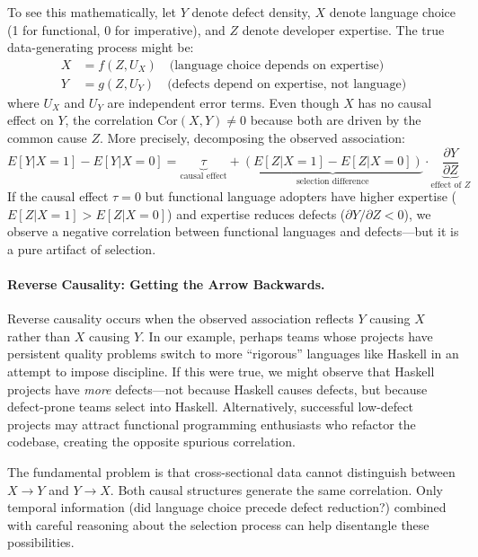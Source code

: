 To see this mathematically, let $Y$ denote defect density, $X$ denote language choice (1 for functional, 0 for imperative), and $Z$ denote developer expertise.
The true data-generating process might be:
\begin{align}
    X &= f(Z, U_X) \quad \text{(language choice depends on expertise)} \\
    Y &= g(Z, U_Y) \quad \text{(defects depend on expertise, not language)}
\end{align}
where $U_X$ and $U_Y$ are independent error terms.
Even though $X$ has no causal effect on $Y$, the correlation $\text{Cor}(X, Y) \neq 0$ because both are driven by the common cause $Z$.
More precisely, decomposing the observed association:
\begin{equation}
    E[Y | X=1] - E[Y | X=0] = \underbrace{\tau}_{\text{causal effect}} + \underbrace{(E[Z | X=1] - E[Z | X=0])}_{\text{selection difference}} \cdot \underbrace{\frac{\partial Y}{\partial Z}}_{\text{effect of $Z$}}
\end{equation}
If the causal effect $\tau = 0$ but functional language adopters have higher expertise ($E[Z|X=1] > E[Z|X=0]$) and expertise reduces defects ($\partial Y / \partial Z < 0$), we observe a negative correlation between functional languages and defects---but it is a pure artifact of selection.

\paragraph{Reverse Causality: Getting the Arrow Backwards.}
Reverse causality occurs when the observed association reflects $Y$ causing $X$ rather than $X$ causing $Y$.
In our example, perhaps teams whose projects have persistent quality problems switch to more ``rigorous'' languages like Haskell in an attempt to impose discipline.
If this were true, we might observe that Haskell projects have \emph{more} defects---not because Haskell causes defects, but because defect-prone teams select into Haskell.
Alternatively, successful low-defect projects may attract functional programming enthusiasts who refactor the codebase, creating the opposite spurious correlation.

The fundamental problem is that cross-sectional data cannot distinguish between $X \to Y$ and $Y \to X$.
Both causal structures generate the same correlation.
Only temporal information (did language choice precede defect reduction?) combined with careful reasoning about the selection process can help disentangle these possibilities.

